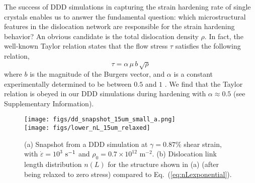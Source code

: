 \documentclass[%
reprint,
 amsmath,amssymb,
 aps,
superscriptaddress,
]{revtex4-1}
\begin{document}
%
%



The success of DDD simulations in capturing the strain hardening rate of single
crystals enables us to answer the fundamental question: which microstructural
features in the dislocation network are responsible for the strain hardening
behavior?
%
An obvious candidate is the total dislocation density $\rho$.  In fact, the 
well-known Taylor relation states that the flow stress $\tau$ satisfies the 
following relation,
%
\begin{equation} 
  \tau = \alpha\, \mu \, b \, \sqrt{\rho} \label{eq:taylor}
\end{equation} 
%
where $b$ is the magnitude of the Burgers vector, and $\alpha$ is a constant
experimentally determined to be between $0.5$ and $1$ \cite{Mecking1981}. 
%
We find that the Taylor relation is obeyed in our DDD simulations during hardening
with $\alpha \approx 0.5$ (see Supplementary Information). 

%



\begin{figure}
\center
%
 \texttt{[image: figs/dd\_snapshot\_15um\_small\_a.png]} \\ 
 \texttt{[image: figs/lower\_nL\_15um\_relaxed]} 
%
\caption{\label{fig:snapshot} (a) Snapshot from a DDD simulation at $\gamma =
0.87\%$ shear strain, with $\dot{\varepsilon}=10^3$ $\rm s^{-1}$ and $\rho_0 =0.7
\times 10^{12}$ m$^{-2}$. (b) Dislocation link length distribution $n(L)$ for
the structure shown in (a) (after being relaxed to zero stress) compared to
Eq.~(\ref{eq:nLexponential}).}
\end{figure}
\end{document}
